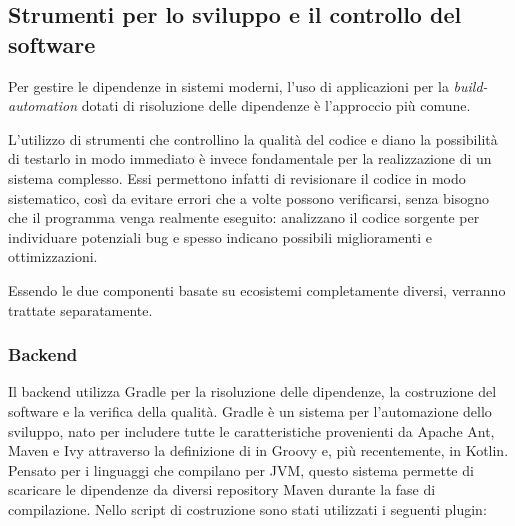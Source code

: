     \subsection{Strumenti per lo sviluppo e il controllo del software}
      Per gestire le dipendenze in sistemi moderni, l'uso di applicazioni per la \emph{build-automation} dotati di risoluzione delle dipendenze è l'approccio più comune.

      L'utilizzo di strumenti che controllino la qualità del codice e diano la possibilità di testarlo in modo immediato è invece fondamentale per la realizzazione di un sistema complesso.
      Essi permettono infatti di revisionare il codice in modo sistematico, così da evitare errori che a volte possono verificarsi, senza bisogno che il programma venga realmente eseguito:
      analizzano il codice sorgente per individuare potenziali bug e spesso indicano possibili miglioramenti e ottimizzazioni.

      Essendo le due componenti basate su ecosistemi completamente diversi, verranno trattate separatamente.

      \subsubsection{Backend}

        Il backend utilizza Gradle per la risoluzione delle dipendenze, la costruzione del software e la verifica della qualità.
        Gradle è un sistema per l'automazione dello sviluppo, nato per includere tutte le caratteristiche provenienti da Apache Ant, Maven e Ivy attraverso la definizione di  in Groovy e, più recentemente, in Kotlin.
        Pensato per i linguaggi che compilano per JVM, questo sistema permette di scaricare le dipendenze da diversi repository Maven durante la fase di compilazione.
        Nello script di costruzione sono stati utilizzati i seguenti plugin:

